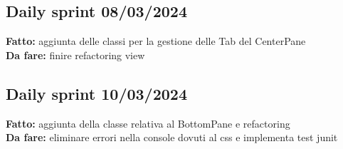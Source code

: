 \documentclass{report}
\begin{document}
\begin{itemize}
\subsection*{Daily sprint 08/03/2024}
\textbf{Fatto:} aggiunta delle classi per la gestione delle Tab del CenterPane\\
\textbf{Da fare:} finire refactoring view
\subsection*{Daily sprint 10/03/2024}
\textbf{Fatto:} aggiunta della classe relativa al BottomPane e refactoring\\
\textbf{Da fare:} eliminare errori nella console dovuti al css e implementa test junit




\end{itemize}
\end{document}
